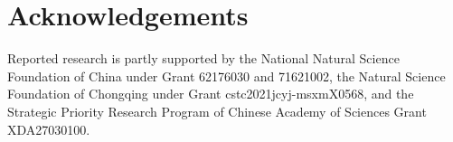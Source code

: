\documentclass{article}
\begin{document}
\section*{Acknowledgements}
Reported research is partly supported by the National Natural Science Foundation of China under Grant 62176030 and 71621002,   the Natural Science Foundation of Chongqing under Grant cstc2021jcyj-msxmX0568, and the Strategic Priority Research Program of Chinese Academy of Sciences Grant XDA27030100.
\small


\end{document}
